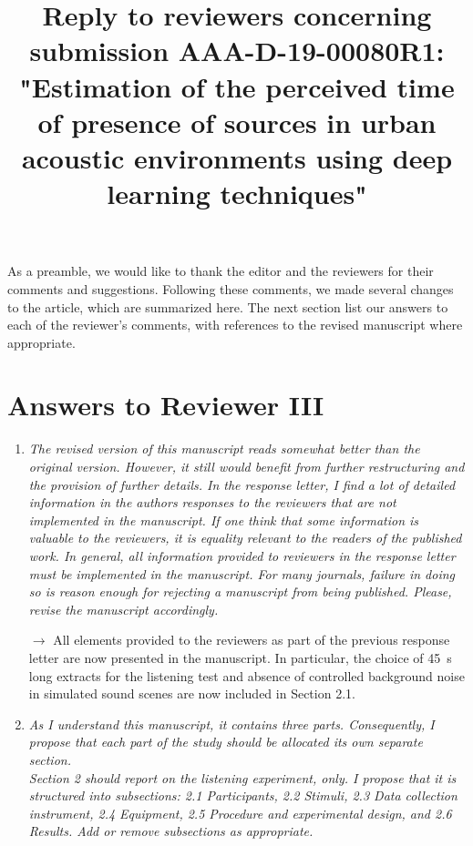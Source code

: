 \documentclass[10pt]{article}
\title{Reply to reviewers concerning submission AAA-D-19-00080R1: "Estimation of the perceived time of presence of sources in urban acoustic environments using deep learning techniques"}
\begin{document}
\maketitle

As a preamble, we would like to thank the editor and the reviewers for their comments and suggestions. Following these comments, we made several changes to the article, which are summarized here. The next section list our answers to each of the reviewer’s comments, with references to the revised manuscript where appropriate.


\section{Answers to Reviewer III}

\begin{enumerate}

\item \emph{The revised version of this manuscript reads somewhat better than the original version. However, it still would benefit from further restructuring and the provision of further details. In the response letter, I find a lot of detailed information in the authors responses to the reviewers that are not implemented in the manuscript. If one think that some information is valuable to the reviewers, it is equality relevant to the readers of the published work. In general, all information provided to reviewers in the response letter must be implemented in the manuscript. For many journals, failure in doing so is reason enough for rejecting a manuscript from being published. Please, revise the manuscript accordingly.}

$\rightarrow$ All elements provided to the reviewers as part of the previous response letter are now presented in the manuscript. In particular, the choice of 45~s long extracts for the listening test and absence of controlled background noise in simulated sound scenes are now included in Section 2.1.

\item \emph{As I understand this manuscript, it contains three parts. Consequently, I propose that each part of the study should be allocated its own separate section.\\
Section 2 should report on the listening experiment, only. I propose that it is structured into subsections: 2.1 Participants, 2.2 Stimuli, 2.3 Data collection instrument, 2.4 Equipment, 2.5 Procedure and experimental design, and 2.6 Results. Add or remove subsections as appropriate.}


\end{enumerate}
\end{document}
